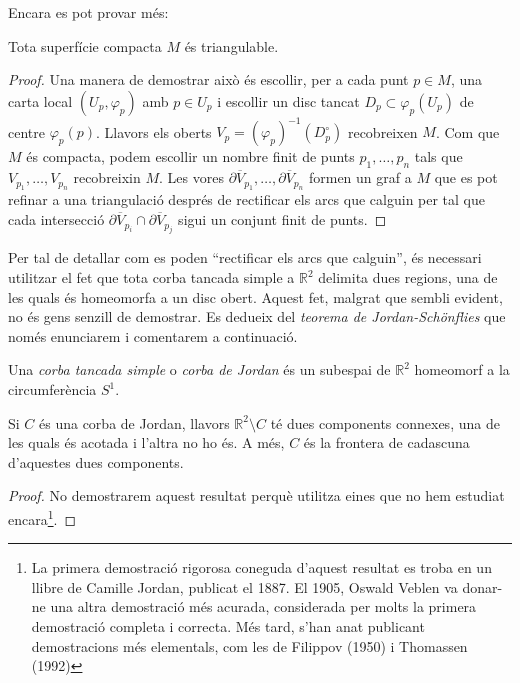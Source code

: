 \documentclass[../main.tex]{subfiles}
\begin{document}
Encara es pot provar més:
\begin{ter}
\label{ter:totasuperficiecompactaestriangulable} Tota superfície compacta $M$ és triangulable.
\end{ter}
\begin{proof}
Una manera de demostrar això és escollir, per a cada punt $p\in M$, una carta local $(U_p,\varphi_p)$ amb $p\in U_p$ i escollir un disc tancat $D_p\subset \varphi_p(U_p)$ de centre $\varphi_p(p)$. Llavors els oberts $V_p = (\varphi_p)^{-1}(D_p^\circ)$ recobreixen $M$. Com que $M$ és compacta, podem escollir un nombre finit de punts $p_1,\ldots,p_n$ tals que $V_{p_1},\ldots,V_{p_n}$ recobreixin $M$. Les vores $\partial\overline{V}_{p_1},\ldots,\partial\overline{V}_{p_n}$ formen un graf a $M$ que es pot refinar a una triangulació després de rectificar els arcs que calguin per tal que cada intersecció $\partial\overline{V}_{p_i}\cap \partial\overline{V}_{p_j}$ sigui un conjunt finit de punts.
\end{proof}

Per tal de detallar com es poden ``rectificar els arcs que calguin'', és necessari utilitzar el fet que tota corba tancada simple a $\mathbb{R}^2$ delimita dues regions, una de les quals és homeomorfa a un disc obert. Aquest fet, malgrat que sembli evident, no és gens senzill de demostrar. Es dedueix del \textit{teorema de Jordan-Schönflies} que només enunciarem i comentarem a continuació.

\begin{defi}
\label{def:corbadejordan} Una \textit{corba tancada simple} o \textit{corba de Jordan} és un subespai de $\mathbb{R}^2$ homeomorf a la circumferència $S^1$.
\end{defi}

\begin{ter}
\label{ter:teoremadejordan} Si $C$ és una corba de Jordan, llavors $\mathbb{R}^2\setminus C$ té dues components connexes, una de les quals és acotada i l'altra no ho és. A més, $C$ és la frontera de cadascuna d'aquestes dues components. 
\end{ter}
\begin{proof}
No demostrarem aquest resultat perquè utilitza eines que no hem estudiat encara\footnote{La primera demostració rigorosa coneguda d'aquest resultat es troba en un llibre de Camille Jordan, publicat el 1887. El 1905, Oswald Veblen va donar-ne una altra demostració més acurada, considerada per molts la primera demostració completa i correcta. Més tard, s'han anat publicant demostracions més elementals, com les de Filippov (1950) i Thomassen (1992)}.
\end{proof}
\end{document}
